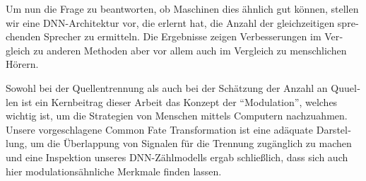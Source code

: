 \begin{otherlanguage}{ngerman}
Um nun die Frage zu beantworten, ob Maschinen dies ähnlich gut können, stellen wir eine DNN-Architektur vor, die erlernt hat, die Anzahl der gleichzeitigen sprechenden Sprecher zu ermitteln.
Die Ergebnisse zeigen Verbesserungen im Vergleich zu anderen Methoden aber vor allem auch im Vergleich zu menschlichen Hörern.
\par
Sowohl bei der Quellentrennung als auch bei der Schätzung der Anzahl an Quuellen ist ein Kernbeitrag dieser Arbeit das Konzept der ``Modulation'', welches wichtig ist, um die Strategien von Menschen mittels Computern nachzuahmen.
Unsere vorgeschlagene Common Fate Transformation ist eine adäquate Darstellung, um die Überlappung von Signalen für die Trennung zugänglich zu machen und eine Inspektion unseres DNN-Zählmodells ergab schließlich, dass sich auch hier modulationsähnliche Merkmale finden lassen.
\end{otherlanguage}

\endgroup

\vfill
